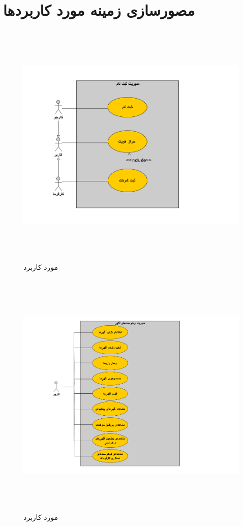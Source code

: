 \documentclass[12pt,svgnames,oneside]{book}
\begin{document}
\section{مصورسازی زمینه‌ مورد کاربرد‌ها}	

\begin{figure}[H]
	\caption{مورد کاربرد }
	\begin{center}
		\includegraphics[width=\textwidth, height=12cm]{./images/1}
	\end{center}
\end{figure}

\begin{figure}[H]
	\caption{مورد کاربرد }
	\begin{center}
		\includegraphics[width=\textwidth, height=12cm]{./images/2}
	\end{center}
\end{figure}
\end{document}

